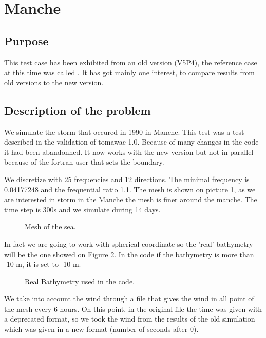 \section{Manche}
%
%
\subsection{Purpose}
%
This test case has been exhibited from an old version (V5P4), the reference case at this time was called . It has got mainly one interest, to compare results from old versions to the new version.  

%
\subsection{Description of the problem}
We simulate the storm that occured in 1990 in Manche. This test was a test described in the validation of tomawac 1.0. Because of many changes in the code it had been abandonned. It now works with the new version but not in parallel because of the fortran user that sets the boundary. 

We discretize with 25 frequencies and 12 directions. The minimal frequency is 0.04177248 and the frequential ratio 1.1.
The mesh is shown on picture \ref{figmanchemesh}, as we are interested in storm in the Manche the mesh is finer around the manche. 
The time step is 300s and we simulate during 14 days. 
\begin{figure} [!h]
\centering
{}
 \caption{Mesh of the sea. }
\label{figmanchemesh}
\end{figure}

In fact we are going to work with spherical coordinate so the 'real' bathymetry will be the one showed on Figure \ref{realbathymanche}. In the code if the bathymetry is more than -10 m, it is set to -10 m.
\begin{figure} [!h]
\centering
{}
 \caption{Real Bathymetry used in the code.}
\label{realbathymanche}
\end{figure}

We take into account the wind through a file that gives the wind in all point of the mesh every 6 hours. On this point, in the original file the time was given with a deprecated format, so we took the wind from the results of the old simulation which was given in a new format (number of seconds after 0).


